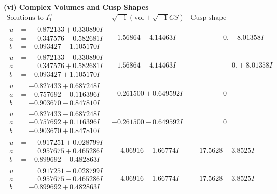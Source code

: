 \documentclass[1p]{elsarticle_modified}
\theoremstyle{definition}
\newcommand{\I}{\sqrt{-1}}
\begin{document}
\newpage\flushleft \textbf{(vi) Complex Volumes and Cusp Shapes}
$$\begin{array}{c|c|c}  
\text{Solutions to }I^u_{1}& \I (\text{vol} + \sqrt{-1}CS) & \text{Cusp shape}\\
 \hline 
\begin{aligned}
u &= \phantom{-}0.872133 + 0.330890 I \\
a &= \phantom{-}0.347576 - 0.582681 I \\
b &= -0.093427 - 1.105170 I\end{aligned}
 & -1.56864 + 4.14463 I & \phantom{-0.000000 } 0. - 8.01358 I \\ \hline\begin{aligned}
u &= \phantom{-}0.872133 - 0.330890 I \\
a &= \phantom{-}0.347576 + 0.582681 I \\
b &= -0.093427 + 1.105170 I\end{aligned}
 & -1.56864 - 4.14463 I & \phantom{-0.000000 -}0. + 8.01358 I \\ \hline\begin{aligned}
u &= -0.827433 + 0.687248 I \\
a &= -0.757692 - 0.116396 I \\
b &= -0.903670 - 0.847810 I\end{aligned}
 & -0.261500 + 0.649592 I & \phantom{-0.000000 } 0 \\ \hline\begin{aligned}
u &= -0.827433 - 0.687248 I \\
a &= -0.757692 + 0.116396 I \\
b &= -0.903670 + 0.847810 I\end{aligned}
 & -0.261500 - 0.649592 I & \phantom{-0.000000 } 0 \\ \hline\begin{aligned}
u &= \phantom{-}0.917251 + 0.028799 I \\
a &= \phantom{-}0.957675 + 0.465286 I \\
b &= -0.899692 - 0.482863 I\end{aligned}
 & \phantom{-}4.06916 + 1.66774 I & \phantom{-}17.5628 - 3.8525 I \\ \hline\begin{aligned}
u &= \phantom{-}0.917251 - 0.028799 I \\
a &= \phantom{-}0.957675 - 0.465286 I \\
b &= -0.899692 + 0.482863 I\end{aligned}
 & \phantom{-}4.06916 - 1.66774 I & \phantom{-}17.5628 + 3.8525 I \\ \hline\begin{aligned}

\end{aligned}
\end{array}$$
\end{document}
